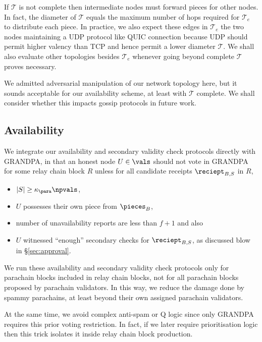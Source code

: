 If $\mathcal{T}$ is not complete then intermediate nodes must forward pieces for other nodes.  In fact, the diameter of $\mathcal{T}$ equals the maximum number of hops required for $\mathcal{T}_e$ to distribute each piece.  
In practice, we also expect these edges in $\mathcal{T}_e$ the two nodes
maintaining a UDP protocol like QUIC connection because UDP should permit higher valency than TCP and hence permit a lower diameter $\mathcal{T}$.  
We shall also evaluate other topologies besides $\mathcal{T}_e$ whenever going beyond complete $\mathcal{T}$ proves necessary.

We admitted adversarial manipulation of our network topology here, but it sounds acceptable for our availability scheme, at least with $\mathcal{T}$ complete.  We shall consider whether this impacts gossip protocols in future work. 


\subsection{Availability} %
\label{sec:availability}

We integrate our availability and secondary validity check protocols directly with GRANDPA, in that an honest node $U \in \vals$ should not vote in GRANDPA for some relay chain block $R$ unless for all candidate receipts $\reciept_{B,S}$ in $R$,
\begin{itemize}
\item $|S| \geq \kappa_\para \npvals$,
\item $U$ possesses their own piece from $\pieces_B$,
\item number of unavailability reports are less than  $f+1$ and also
\item $U$ witnessed ``enough'' secondary checks for $\reciept_{B,S}$,
 as discussed blow in \S\ref{sec:approval}.
\end{itemize}

We run these availability and secondary validity check protocols only for parachain blocks included in relay chain blocks, not for all parachain blocks proposed by parachain validators.  In this way, we reduce the damage done by spammy parachains, at least beyond their own assigned parachain validators.

At the same time, we avoid complex anti-spam or Q logic since only GRANDPA requires this prior voting restriction.  In fact, if we later require prioritisation logic then this trick isolates it inside relay chain block production.


